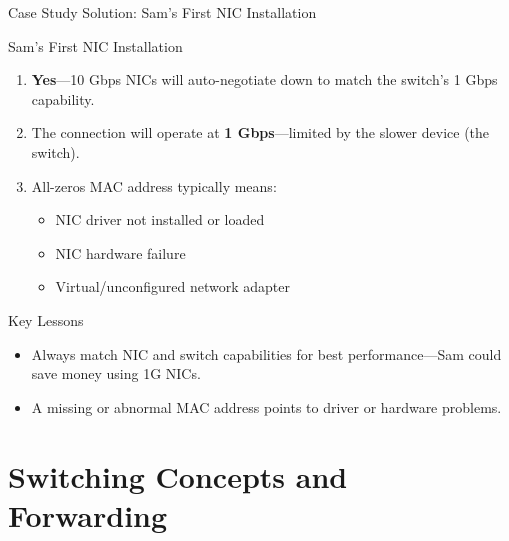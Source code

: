 \documentclass[aspectratio=169]{beamer}  %
\begin{document}
\begin{frame}{Case Study Solution: Sam's First NIC Installation}
    \begin{casesolution}{Sam's First NIC Installation}
        \begin{enumerate}
            \item \textbf{Yes}---10 Gbps NICs will auto-negotiate down to match the switch's 1 Gbps capability.
            \item The connection will operate at \textbf{1 Gbps}---limited by the slower device (the switch).
            \item All-zeros MAC address typically means:
                \begin{itemize}
                    \item NIC driver not installed or loaded
                    \item NIC hardware failure
                    \item Virtual/unconfigured network adapter
                \end{itemize}
        \end{enumerate}
    \end{casesolution}
    
    \vspace{0.3em}
    \begin{alertblock}{Key Lessons}
        \begin{itemize}
            \item Always match NIC and switch capabilities for best performance---Sam could save money using 1G NICs.
            \item A missing or abnormal MAC address points to driver or hardware problems.
        \end{itemize}
    \end{alertblock}
\end{frame}

\section{Switching Concepts and Forwarding}
\end{document}
